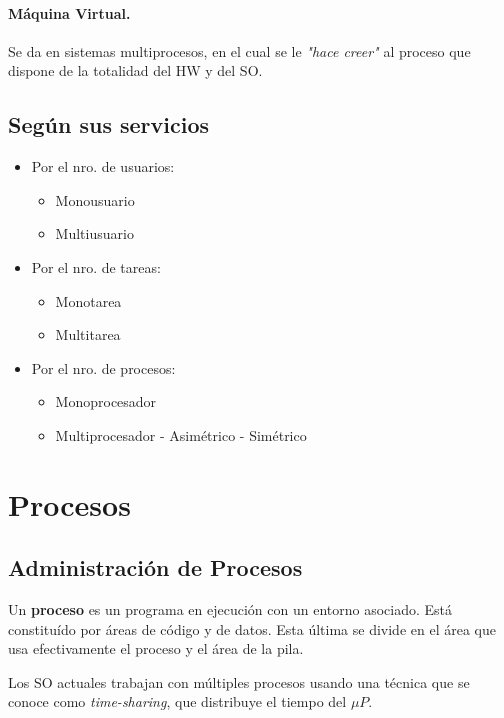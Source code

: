 \documentclass[10pt,a4paper]{article}
\begin{document}
\paragraph{Máquina Virtual.} Se da en sistemas multiprocesos, en el cual se le  \textit{"hace creer"} al proceso que dispone de la totalidad del HW y del SO.

\subsection{Según sus servicios}
\begin{multicols}{2} 
\begin{itemize}
\item Por el nro. de usuarios:
\begin{itemize}
\item Monousuario
\item Multiusuario
\end{itemize}

\item Por el nro. de tareas:
\begin{itemize}
\item Monotarea
\item Multitarea
\end{itemize}

\item Por el nro. de procesos:
\begin{itemize}
\item Monoprocesador
\item Multiprocesador
\subitem - Asimétrico
\subitem - Simétrico
\end{itemize}
\end{itemize}
\end{multicols} 

\section{Procesos}
\subsection{Administración de Procesos}
Un \textbf{proceso} es un programa en ejecución con un entorno asociado. Está constituído por áreas de código y de datos. Esta última se divide en el área que usa efectivamente el proceso y el área de la pila.

Los SO actuales trabajan con múltiples procesos usando una técnica que se conoce como \textit{time-sharing}, que distribuye el tiempo del $\mu P$.
\end{document}
